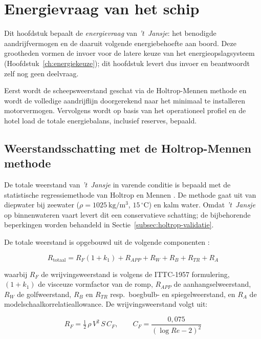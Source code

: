 \chapter{Energievraag van het schip}
\label{ch:energievraag}
\label{ch:holtrop-aandrijflijn}

\noindent Dit hoofdstuk bepaalt de \emph{energievraag} van \emph{'t~Jansje}: het
benodigde aandrijfvermogen en de daaruit volgende energiebehoefte aan boord. Deze
grootheden vormen de invoer voor de latere keuze van het energieopslagsysteem
(Hoofdstuk~\ref{ch:energiekeuze}); dit hoofdstuk levert dus invoer en beantwoordt
zelf nog geen deelvraag.

\noindent Eerst wordt de scheepsweerstand geschat via de Holtrop-Mennen methode en
wordt de volledige aandrijflijn doorgerekend naar het minimaal te installeren
motorvermogen. Vervolgens wordt op basis van het operationeel profiel en de hotel
load de totale energiebalans, inclusief reserves, bepaald.

\section{Weerstandsschatting met de Holtrop-Mennen methode}
\label{sec:holtrop}

De totale weerstand van \emph{'t~Jansje} in varende conditie is bepaald met de
statistische regressiemethode van Holtrop en Mennen \cite{Holtrop1984}. De methode
gaat uit van diepwater bij zeewater ($\rho = 1025\ \mathrm{kg/m^3}$,
$15\,^{\circ}\mathrm{C}$) en kalm water. Omdat \emph{'t~Jansje} op binnenwateren
vaart levert dit een conservatieve schatting; de bijbehorende beperkingen worden
behandeld in Sectie~\ref{subsec:holtrop-validatie}.

De totale weerstand is opgebouwd uit de volgende componenten \cite{Holtrop1984}:

\begin{equation}
    R_\mathrm{totaal} = R_F(1+k_1) + R_{APP} + R_W + R_B + R_{TR} + R_A
    \label{eq:Rtot}
\end{equation}

\noindent waarbij $R_F$ de wrijvingsweerstand is volgens de ITTC-1957 formulering,
$(1+k_1)$ de visceuze vormfactor van de romp, $R_{APP}$ de aanhangselweerstand,
$R_W$ de golfweerstand, $R_B$ en $R_{TR}$ resp.\ boegbulb- en spiegelweerstand,
en $R_A$ de modelschaalkorrelatieallowance. De wrijvingsweerstand volgt uit:

\begin{equation}
    R_F = \tfrac{1}{2}\,\rho\,V^2\,S\,C_F, \qquad
    C_F = \frac{0{,}075}{(\log Re - 2)^2}
    \label{eq:RF}
\end{equation}

